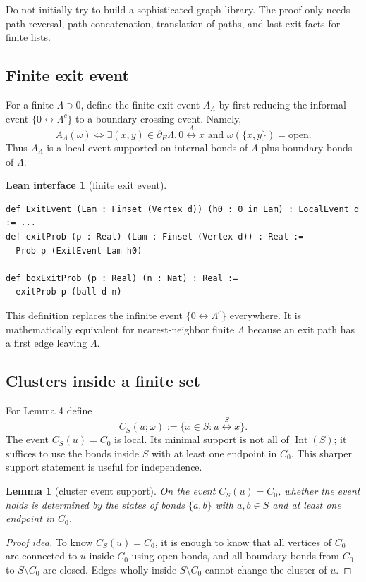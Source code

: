 \documentclass[11pt]{article}
\newcommand{\conn}{\longleftrightarrow}
\newcommand{\Lam}{\Lambda}
\newcommand{\dE}{\partial_E}
\newcommand{\Int}{\operatorname{Int}}
\theoremstyle{definition}
\newtheorem{interface}[definition]{Lean interface}
\theoremstyle{plain}
\newtheorem{lemma}[definition]{Lemma}
\begin{document}
Do not initially try to build a sophisticated graph library.  The proof only needs path reversal, path concatenation, translation of paths, and last-exit facts for finite lists.

\subsection{Finite exit event}

For a finite $\Lam\ni0$, define the finite exit event $A_\Lam$ by first reducing the informal event $\{0\conn\Lam^c\}$ to a boundary-crossing event.  Namely,
\[
  A_\Lam(\omega) \iff
  \exists (x,y)\in\dE\Lam,
       0\stackrel{\Lam}{\conn}x
       \text{ and } \omega(\{x,y\})=\mathrm{open}.
\]
Thus $A_\Lam$ is a local event supported on internal bonds of $\Lam$ plus boundary bonds of $\Lam$.

\begin{interface}[finite exit event]
\begin{lstlisting}
def ExitEvent (Lam : Finset (Vertex d)) (h0 : 0 in Lam) : LocalEvent d := ...
def exitProb (p : Real) (Lam : Finset (Vertex d)) : Real :=
  Prob p (ExitEvent Lam h0)

def boxExitProb (p : Real) (n : Nat) : Real :=
  exitProb p (ball d n)
\end{lstlisting}
\end{interface}

This definition replaces the infinite event $\{0\conn\Lam^c\}$ everywhere.  It is mathematically equivalent for nearest-neighbor finite $\Lam$ because an exit path has a first edge leaving $\Lam$.

\subsection{Clusters inside a finite set}

For Lemma 4 define
\[
  C_S(u;\omega):=\{x\in S:u\stackrel S\conn x\}.
\]
The event $C_S(u)=C_0$ is local.  Its minimal support is not all of $\Int(S)$; it suffices to use the bonds inside $S$ with at least one endpoint in $C_0$.  This sharper support statement is useful for independence.

\begin{lemma}[cluster event support]
On the event $C_S(u)=C_0$, whether the event holds is determined by the states of bonds $\{a,b\}$ with $a,b\in S$ and at least one endpoint in $C_0$.
\end{lemma}
\begin{proof}[Proof idea]
To know $C_S(u)=C_0$, it is enough to know that all vertices of $C_0$ are connected to $u$ inside $C_0$ using open bonds, and all boundary bonds from $C_0$ to $S\setminus C_0$ are closed.  Edges wholly inside $S\setminus C_0$ cannot change the cluster of $u$.
\end{proof}
\end{document}
